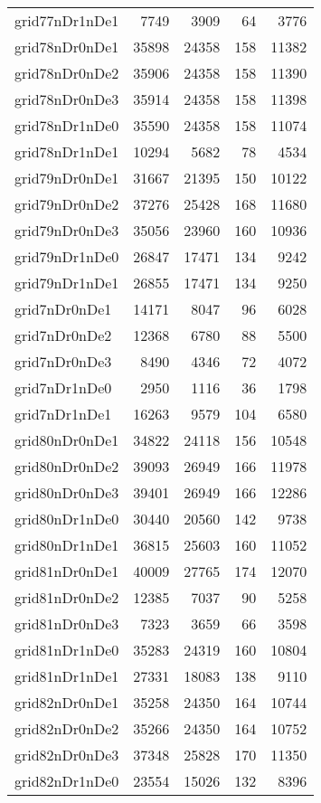 \begin{longtable}{lrrrr}
grid77nDr1nDe1 & 7749 & 3909 & 64 & 3776 \\
grid78nDr0nDe1 & 35898 & 24358 & 158 & 11382 \\
grid78nDr0nDe2 & 35906 & 24358 & 158 & 11390 \\
grid78nDr0nDe3 & 35914 & 24358 & 158 & 11398 \\
grid78nDr1nDe0 & 35590 & 24358 & 158 & 11074 \\
grid78nDr1nDe1 & 10294 & 5682 & 78 & 4534 \\
grid79nDr0nDe1 & 31667 & 21395 & 150 & 10122 \\
grid79nDr0nDe2 & 37276 & 25428 & 168 & 11680 \\
grid79nDr0nDe3 & 35056 & 23960 & 160 & 10936 \\
grid79nDr1nDe0 & 26847 & 17471 & 134 & 9242 \\
grid79nDr1nDe1 & 26855 & 17471 & 134 & 9250 \\
grid7nDr0nDe1 & 14171 & 8047 & 96 & 6028 \\
grid7nDr0nDe2 & 12368 & 6780 & 88 & 5500 \\
grid7nDr0nDe3 & 8490 & 4346 & 72 & 4072 \\
grid7nDr1nDe0 & 2950 & 1116 & 36 & 1798 \\
grid7nDr1nDe1 & 16263 & 9579 & 104 & 6580 \\
grid80nDr0nDe1 & 34822 & 24118 & 156 & 10548 \\
grid80nDr0nDe2 & 39093 & 26949 & 166 & 11978 \\
grid80nDr0nDe3 & 39401 & 26949 & 166 & 12286 \\
grid80nDr1nDe0 & 30440 & 20560 & 142 & 9738 \\
grid80nDr1nDe1 & 36815 & 25603 & 160 & 11052 \\
grid81nDr0nDe1 & 40009 & 27765 & 174 & 12070 \\
grid81nDr0nDe2 & 12385 & 7037 & 90 & 5258 \\
grid81nDr0nDe3 & 7323 & 3659 & 66 & 3598 \\
grid81nDr1nDe0 & 35283 & 24319 & 160 & 10804 \\
grid81nDr1nDe1 & 27331 & 18083 & 138 & 9110 \\
grid82nDr0nDe1 & 35258 & 24350 & 164 & 10744 \\
grid82nDr0nDe2 & 35266 & 24350 & 164 & 10752 \\
grid82nDr0nDe3 & 37348 & 25828 & 170 & 11350 \\
grid82nDr1nDe0 & 23554 & 15026 & 132 & 8396 \\

\end{longtable}
